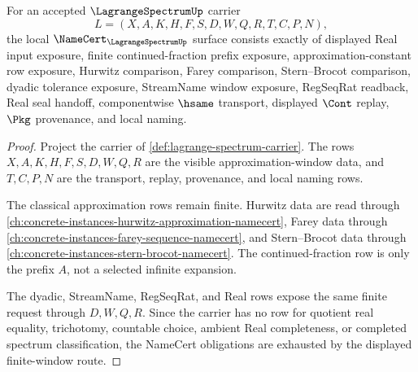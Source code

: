 \begin{theorem}
\label{thm:lagrange-spectrum-namecert-obligations}
For an accepted $\LagrangeSpectrumUp$ carrier
$$
L=(X,A,K,H,F,S,D,W,Q,R,T,C,P,N),
$$
the local $\NameCert_{\LagrangeSpectrumUp}$ surface consists exactly of displayed Real input exposure, finite continued-fraction prefix exposure, approximation-constant row exposure, Hurwitz comparison, Farey comparison, Stern--Brocot comparison, dyadic tolerance exposure, StreamName window exposure, RegSeqRat readback, Real seal handoff, componentwise $\hsame$ transport, displayed $\Cont$ replay, $\Pkg$ provenance, and local naming.
\end{theorem}
\begin{proof}
Project the carrier of \autoref{def:lagrange-spectrum-carrier}. The rows $X,A,K,H,F,S,D,W,Q,R$ are the visible approximation-window data, and $T,C,P,N$ are the transport, replay, provenance, and local naming rows.

The classical approximation rows remain finite. Hurwitz data are read through \autoref{ch:concrete-instances-hurwitz-approximation-namecert}, Farey data through \autoref{ch:concrete-instances-farey-sequence-namecert}, and Stern--Brocot data through \autoref{ch:concrete-instances-stern-brocot-namecert}. The continued-fraction row is only the prefix $A$, not a selected infinite expansion.

The dyadic, StreamName, RegSeqRat, and Real rows expose the same finite request through $D,W,Q,R$. Since the carrier has no row for quotient real equality, trichotomy, countable choice, ambient Real completeness, or completed spectrum classification, the NameCert obligations are exhausted by the displayed finite-window route.
\end{proof}

